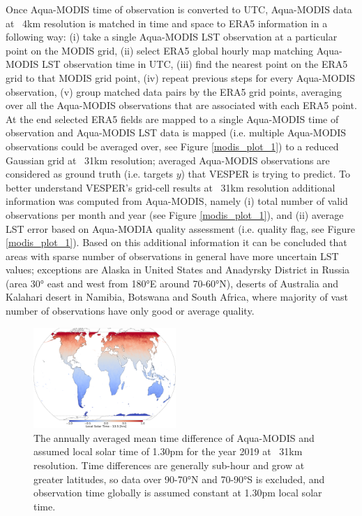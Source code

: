 \documentclass[hess, twostagejnl]{copernicus}
\begin{document}
\noindent Once Aqua-MODIS time of observation is converted to UTC, Aqua-MODIS data at ~4km resolution is matched in time and space to ERA5 information in a following way: (i) take a single Aqua-MODIS LST observation at a particular point on the MODIS grid, (ii) select ERA5 global hourly map matching Aqua-MODIS LST observation time in UTC, (iii) find the nearest point on the ERA5 grid to that MODIS grid point, (iv) repeat previous steps for every Aqua-MODIS observation, (v) group matched data pairs by the ERA5 grid points, averaging over all the Aqua-MODIS observations that are associated with each ERA5 point. At the end selected ERA5 fields are mapped to a single Aqua-MODIS time of observation and Aqua-MODIS LST data is mapped (i.e. multiple Aqua-MODIS observations could be averaged over, see Figure \ref{modis_plot_1}) to a reduced Gaussian grid at ~31km resolution; averaged Aqua-MODIS observations are considered as ground truth (i.e. targets $y$) that VESPER is trying to predict. To better understand VESPER’s grid-cell results at ~31km resolution additional information was computed from Aqua-MODIS, namely (i) total number of valid observations per month and year (see Figure \ref{modis_plot_1}), and (ii) average LST error based on Aqua-MODIA quality assessment (i.e. quality flag, see Figure \ref{modis_plot_1}). Based on this additional information it can be concluded that areas with sparse number of observations in general have more uncertain LST values; exceptions are Alaska in United States and Anadyrsky District in Russia (area 30° east and west from 180°E around 70-60°N), deserts of Australia and Kalahari desert in Namibia, Botswana and South Africa, where majority of vast number of observations have only good or average quality.

\begin{figure}
	\includegraphics[width=0.48\textwidth]{MODIS_local_solar_time_diff}
	\caption{The annually averaged mean time difference of Aqua-MODIS and assumed local solar time of 1.30pm for the year 2019 at ~31km resolution. Time differences are generally sub-hour and grow at greater latitudes, so data over 90-70°N and 70-90°S is excluded, and observation time globally is assumed constant at 1.30pm local solar time.} 
	\label{fig:MODIS_time_error}
\end{figure}
\end{document}
